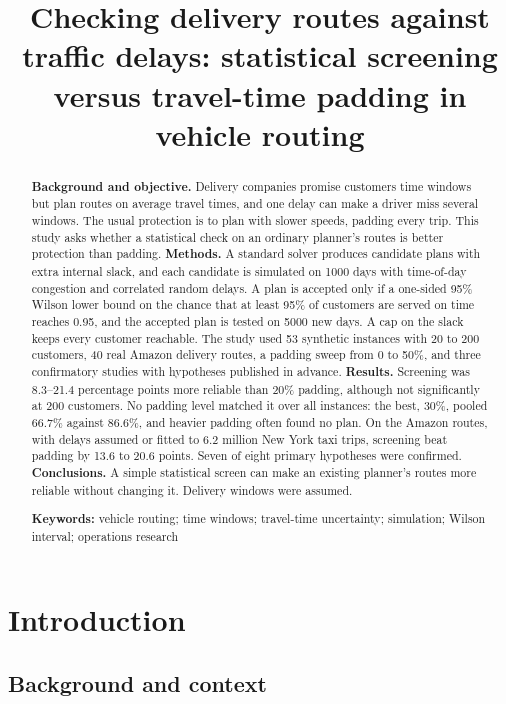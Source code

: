 \documentclass[12pt,letterpaper]{article}
\title{Checking delivery routes against traffic delays: statistical screening
versus travel-time padding in vehicle routing}
\author{}
\date{}
\newcommand{\ProcConsRange}{8.3--21.4}
\newcommand{\PadCapPooled}{86.6}
\newcommand{\PadThirtyPooled}{66.7}
\newcommand{\AmzRoutes}{40}
\newcommand{\AmzCapDiffMin}{13.6}
\newcommand{\AmzCapDiffMax}{20.6}
\newcommand{\NycTripsM}{6.2}
\begin{document}
\maketitle

\begin{abstract}
\noindent\textbf{Background and objective.} Delivery companies promise customers
time windows but plan routes on average travel times, and one delay can make a
driver miss several windows. The usual protection is to
plan with slower speeds, padding every trip. This study asks whether a statistical
check on an ordinary planner's routes is better protection than padding. \textbf{Methods.} A standard solver produces candidate
plans with extra internal slack, and each candidate is simulated on 1000
days with time-of-day congestion and correlated random delays. A plan is accepted
only if a one-sided 95\% Wilson lower bound on the chance that at least 95\% of
customers are served on time reaches 0.95, and the accepted plan is tested
on 5000 new days. A cap on the slack keeps every customer reachable. The study
used 53 synthetic instances with 20 to 200 customers, \AmzRoutes{} real Amazon
delivery routes, a padding sweep from 0 to 50\%, and three confirmatory studies
with hypotheses published in advance. \textbf{Results.} Screening was \ProcConsRange{} percentage points more
reliable than 20\% padding, although not significantly at 200 customers. No padding
level matched it over all instances: the best, 30\%, pooled \PadThirtyPooled\%
against \PadCapPooled\%, and heavier padding often found no plan. On the Amazon routes, with delays assumed or
fitted to \NycTripsM{} million New York taxi trips, screening beat padding by
\AmzCapDiffMin{} to \AmzCapDiffMax{} points. Seven of
eight primary hypotheses were confirmed. \textbf{Conclusions.} A
simple statistical screen can make an existing planner's routes more reliable without changing it. Delivery windows were assumed.

\medskip\noindent\textbf{Keywords:} vehicle routing; time windows; travel-time
uncertainty; simulation; Wilson interval; operations research
\end{abstract}

\section{Introduction}

\subsection{Background and context}
\end{document}
